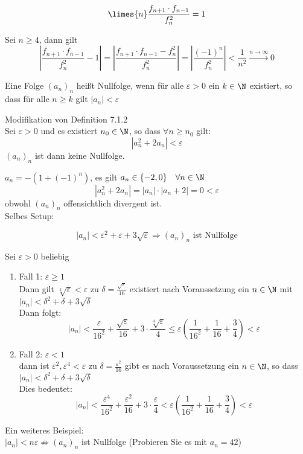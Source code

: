 \documentclass[12pt,a4paper,titlepage,draft]{article}
\begin{document}
	\begin{beh}[2]
		\[\limes{n} \frac{f_{n+1} \cdot f_{n-1}}{f_n^2} = 1\]
	\end{beh}
	\begin{bew}
		Sei \(n \geq 4\), dann gilt
		\[\left|\frac{f_{n+1} \cdot f_{n-1}}{f_n^2} - 1\right| = \left|\frac{f_{n+1} \cdot f_{n-1} - f_n^2}{f_n^2}\right| = \left|\frac{(-1)^n}{f_n^2}\right| < \frac{1}{n^2} \overset{n \rightarrow \infty}{\rightarrow} 0\]
	\end{bew}
	\begin{defi}
		Eine Folge \((a_n)_n\) heißt Nullfolge, wenn für alle \(\varepsilon > 0\) ein \(k \in \N\) existiert, so dass für alle \(n \geq k\) gilt \(|a_n| < \varepsilon\)
	\end{defi}
	\begin{defi}
		Modifikation von Definition 7.1.2\\
		Sei \(\varepsilon > 0\) und es existiert \(n_0 \in \N\), so dass \(\forall n \geq n_0\) gilt:
		\[|a_n^2 + 2a_n| < \varepsilon\]
		\((a_n)_n\) ist dann keine Nullfolge.
	\end{defi}
	\begin{bsp}
		\(a_n = -(1 + (-1)^n)\), es gilt \(a_n \in \{-2, 0\} \quad \forall n \in \N\)
		\[|a_n^2 + 2a_n| = |a_n| \cdot |a_n + 2| = 0 < \varepsilon\]
		obwohl \((a_n)_n\) offensichtlich divergent ist.\\
		Selbes Setup:
		\begin{beh}
			\[|a_n| < \varepsilon^2 + \varepsilon + 3\sqrt{\varepsilon} \Rightarrow (a_n)_n \text{ ist Nullfolge}\]
		\end{beh}
		\begin{bew}
			Sei \(\varepsilon > 0\) beliebig\\
			\begin{enumerate}
				\item Fall 1: \(\varepsilon \geq 1\)\\
					Dann gilt \(\sqrt[k]{\varepsilon} < \varepsilon\) zu \(\delta = \frac{\sqrt{\varepsilon}}{16}\) existiert nach Voraussetzung ein \(n \in \N\) mit \(|a_n| < \delta^2 + \delta + 3\sqrt{\delta}\)\\
					Dann folgt:
					\[|a_n| < \frac{\varepsilon}{16^2} + \frac{\sqrt{\varepsilon}}{16} + 3 \cdot \frac{\sqrt[4]{\varepsilon}}{4} \leq \varepsilon\left(\frac{1}{16^2} + \frac{1}{16} + \frac{3}{4}\right) < \varepsilon\]
				\item Fall 2: \(\varepsilon < 1\)\\
					dann ist \(\varepsilon^2, \varepsilon^4 < \varepsilon\) zu \(\delta = \frac{\varepsilon^2}{16}\) gibt es nach Voraussetzung ein \(n \in \N\), so dass \(|a_n| < \delta^2 + \delta + 3\sqrt{\delta}\)\\
					Dies bedeutet:
					\[|a_n| < \frac{\varepsilon^4}{16^2} + \frac{\varepsilon^2}{16} + 3 \cdot \frac{\varepsilon}{4} < \varepsilon\left(\frac{1}{16^2} + \frac{1}{16} + \frac{3}{4}\right) < \varepsilon\]
			\end{enumerate}
		\end{bew}
		Ein weiteres Beispiel:\\
		\(|a_n| < n\varepsilon \not \Rightarrow (a_n)_n\) ist Nullfolge (Probieren Sie es mit \(a_n = 42\))
	\end{bsp}
\end{document}
